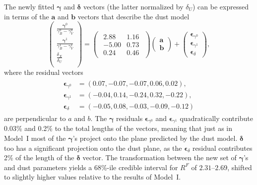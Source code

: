 \documentclass{aastex61}   	%
\begin{document}
The newly fitted $\pmb{\gamma}$ and  $\pmb{\delta}$ vectors (the latter normalized by $\delta_U$) can be expressed 
in terms of the $\mathbf{a}$ and $\mathbf{b}$ vectors that describe the  dust model
\begin{equation}
\begin{pmatrix}
 \frac{\pmb{\gamma}^0}{\gamma^0_B-\gamma^0_V} \\
\frac{\pmb{\gamma}^1}{\gamma^1_B-\gamma^1_V} \\
\frac{\delta_X}{\delta_U} \\
\end{pmatrix}=
\begin{pmatrix}
\begin{array}{rr}
2.88 & 1.16 \\
-5.00 & 0.73 \\
0.24 & 0.46
\end{array}
\end{pmatrix} 
\begin{pmatrix}
\mathbf{a} \\
\mathbf{b}
\end{pmatrix}+
\begin{pmatrix}
\pmb{\epsilon}_{\gamma^0} \\
\pmb{\epsilon}_{\gamma^1} \\
\pmb{\epsilon}_{\delta}
\end{pmatrix},
\label{model2trans:eqn}
\end{equation}
where the residual vectors
\begin{align}
\begin{split}
\pmb{\epsilon}_{\gamma^0} &=(0.07, -0.07, -0.07,  0.06,  0.02),\\
\pmb{\epsilon}_{\gamma^1} &=( -0.04, 0.14,  -0.24,  0.32, -0.22),\\
\pmb{\epsilon}_{\delta} &=(-0.05, 0.08,  -0.03,  -0.09, -0.12)
\end{split}
\label{model2res:eqn}
\end{align}
are perpendicular to $a$ and $b$.
The $\pmb{\gamma}$ residuals $\pmb{\epsilon}_{\gamma^0}$ and
$\pmb{\epsilon}_{\gamma^1} $
quadratically contribute 0.03\% and 0.2\% to the total  lengths of the vectors, meaning that just as in Model~I most
of the $\pmb{\gamma}$'s project onto the plane predicted by the  dust model.
 $\pmb{\delta}$ too
has a significant projection onto the dust plane, as the $\pmb{\epsilon}_{\delta}$ residual contributes 2\% of the length of the $\pmb{\delta}$ vector.
The transformation between the new set of $\pmb{\gamma}$'s and dust parameters yields
a 68\%-ile  credible interval for $R^F$ of  $2.31$--$2.69$, shifted to slightly  higher values relative to the results of Model~I.
\end{document}
